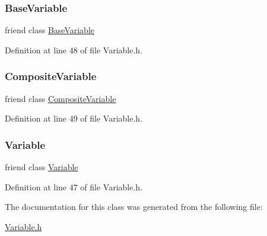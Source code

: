 \subsubsection{\texorpdfstring{Base\+Variable}{BaseVariable}}
{\footnotesize\ttfamily friend class \hyperlink{classocra_1_1BaseVariable}{Base\+Variable}\hspace{0.3cm}{\ttfamily [friend]}}



Definition at line 48 of file Variable.\+h.

\hypertarget{classocra_1_1VariableHasRestrictedClassDerivation_a5ab4ec1f2934216b6101035293996613}{}\label{classocra_1_1VariableHasRestrictedClassDerivation_a5ab4ec1f2934216b6101035293996613} 
\subsubsection{\texorpdfstring{Composite\+Variable}{CompositeVariable}}
{\footnotesize\ttfamily friend class \hyperlink{classocra_1_1CompositeVariable}{Composite\+Variable}\hspace{0.3cm}{\ttfamily [friend]}}



Definition at line 49 of file Variable.\+h.

\hypertarget{classocra_1_1VariableHasRestrictedClassDerivation_a9b0a9a1a9dc58fc36b535bb33c612b49}{}\label{classocra_1_1VariableHasRestrictedClassDerivation_a9b0a9a1a9dc58fc36b535bb33c612b49} 
\subsubsection{\texorpdfstring{Variable}{Variable}}
{\footnotesize\ttfamily friend class \hyperlink{classocra_1_1Variable}{Variable}\hspace{0.3cm}{\ttfamily [friend]}}



Definition at line 47 of file Variable.\+h.



The documentation for this class was generated from the following file\+:\begin{DoxyCompactItemize}
\item 
\hyperlink{Variable_8h}{Variable.\+h}\end{DoxyCompactItemize}
